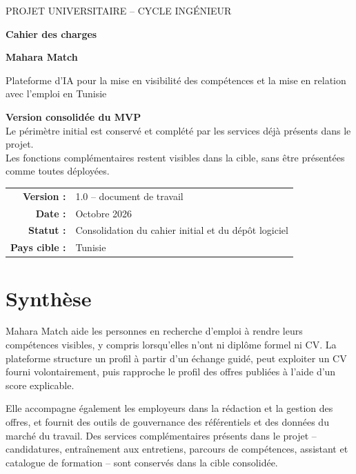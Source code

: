\documentclass[11pt,a4paper]{article}
\begin{document}
\begin{titlepage}
  \centering
  \vspace*{2.2cm}
  {\Large\textcolor{maharaBlue}{PROJET UNIVERSITAIRE -- CYCLE INGÉNIEUR}\par}
  \vspace{1.1cm}
  {\Huge\bfseries Cahier des charges\par}
  \vspace{0.25cm}
  {\LARGE\bfseries Mahara Match\par}
  \vspace{0.7cm}
  {\large Plateforme d'IA pour la mise en visibilité des compétences et la mise en relation avec l'emploi en Tunisie\par}
  \vspace{1.4cm}
  \colorbox{maharaPale}{\parbox{0.82\textwidth}{\centering
    \textbf{Version consolidée du MVP}\\
    Le périmètre initial est conservé et complété par les services déjà présents dans le projet.\\
    Les fonctions complémentaires restent visibles dans la cible, sans être présentées comme toutes déployées.
  }}
  \vfill
  \begin{tabular}{rl}
    \textbf{Version :} & 1.0 -- document de travail\\
    \textbf{Date :} & Octobre 2026\\
    \textbf{Statut :} & Consolidation du cahier initial et du dépôt logiciel\\
    \textbf{Pays cible :} & Tunisie\\
  \end{tabular}
  \vspace*{1.3cm}
\end{titlepage}

\tableofcontents
\newpage

\section{Synthèse}

Mahara Match aide les personnes en recherche d'emploi à rendre leurs compétences visibles, y compris lorsqu'elles n'ont ni diplôme formel ni CV. La plateforme structure un profil à partir d'un échange guidé, peut exploiter un CV fourni volontairement, puis rapproche le profil des offres publiées à l'aide d'un score explicable.

Elle accompagne également les employeurs dans la rédaction et la gestion des offres, et fournit des outils de gouvernance des référentiels et des données du marché du travail. Des services complémentaires présents dans le projet -- candidatures, entraînement aux entretiens, parcours de compétences, assistant et catalogue de formation -- sont conservés dans la cible consolidée.
\end{document}
